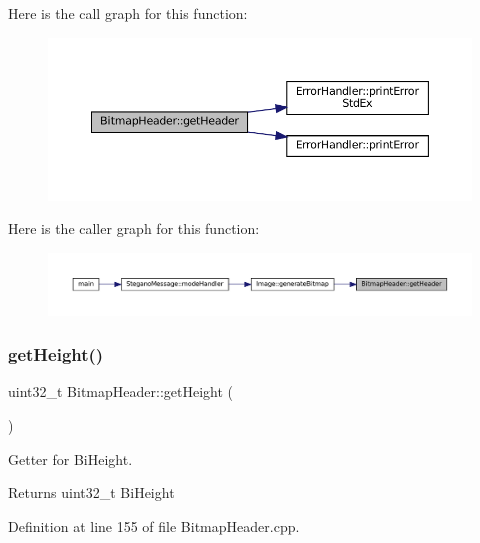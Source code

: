 Here is the call graph for this function\+:
\nopagebreak
\begin{figure}[H]
\begin{center}
\leavevmode
\includegraphics[width=350pt]{classBitmapHeader_aa29e1acc8a7a588867039d7c0bdcde04_cgraph}
\end{center}
\end{figure}
Here is the caller graph for this function\+:
\nopagebreak
\begin{figure}[H]
\begin{center}
\leavevmode
\includegraphics[width=350pt]{classBitmapHeader_aa29e1acc8a7a588867039d7c0bdcde04_icgraph}
\end{center}
\end{figure}
\mbox{\label{classBitmapHeader_a106f72d6c256327342029edf8e18bde1}} 
\subsubsection{\texorpdfstring{getHeight()}{getHeight()}}
{\footnotesize\ttfamily uint32\+\_\+t Bitmap\+Header\+::get\+Height (\begin{DoxyParamCaption}{ }\end{DoxyParamCaption})}



Getter for Bi\+Height. 

\begin{DoxyReturn}{Returns}
uint32\+\_\+t Bi\+Height 
\end{DoxyReturn}


Definition at line 155 of file Bitmap\+Header.\+cpp.

